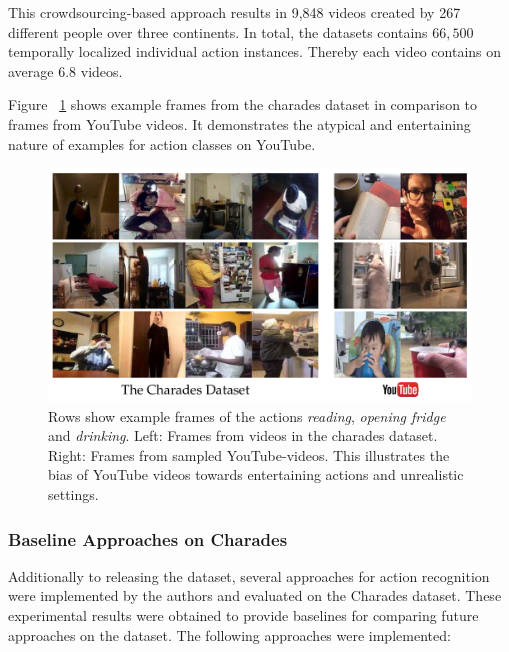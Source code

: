 This crowdsourcing-based approach results in 9,848 videos created by 267 different people over three continents.
In total, the datasets contains $66,500$ temporally localized individual action instances.
Thereby each video contains on average 6.8 videos.

Figure ~\ref{fig:charades_vs_youtube} shows example frames from the charades dataset in comparison to frames from YouTube videos.
It demonstrates the atypical and entertaining nature of examples for action classes on YouTube.

\begin{figure}[H]
    \centering
    \includegraphics[width=\textwidth]{img_datasets/charades_vs_youtube}
    \caption{Rows show example frames of the actions \textit{reading}, \textit{opening fridge} and \textit{drinking}. Left: Frames from videos in the charades dataset. Right: Frames from sampled YouTube-videos. This illustrates the bias of YouTube videos towards entertaining actions and unrealistic settings. \cite{sigurdsson_hollywood_2016}}
    \label{fig:charades_vs_youtube}
\end{figure}

\subsubsection{Baseline Approaches on Charades}
\label{subsubsec:charades_baselines}

Additionally to releasing the dataset, several approaches for action recognition were implemented by the authors and evaluated on the Charades dataset.
These experimental results were obtained to provide baselines for comparing future approaches on the dataset.
The following approaches were implemented:

